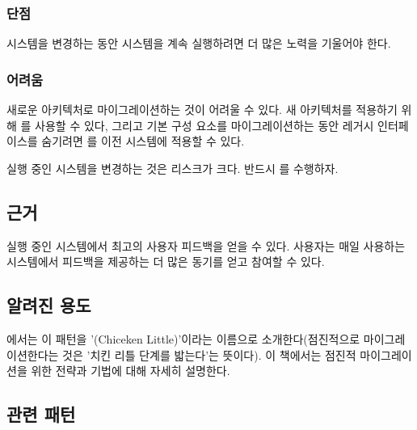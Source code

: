\documentclass[a4paper,10pt,twoside]{book}
\begin{document}
\subsubsection*{단점}

\begin{bulletlist}
\item 시스템을 변경하는 동안 시스템을 계속 실행하려면 더 많은 노력을 기울어야 한다.
\end{bulletlist}

\subsubsection*{어려움}

\begin{bulletlist}
\item 새로운 아키텍처로 마이그레이션하는 것이 어려울 수 있다. 새 아키텍처를 적용하기 위해 를 사용할 수 있다, 그리고 기본 구성 요소를 마이그레이션하는 동안 레거시 인터페이스를 숨기려면 를 이전 시스템에 적용할 수 있다.

\item 실행 중인 시스템을 변경하는 것은 리스크가 크다. 반드시 를 수행하자. 
\end{bulletlist}

\subsection*{근거}

실행 중인 시스템에서 최고의 사용자 피드백을 얻을 수 있다. 사용자는 매일 사용하는 시스템에서 피드백을 제공하는 더 많은 동기를 얻고 참여할 수 있다.

\subsection*{알려진 용도}

 \cite{Brod95a}에서는 이 패턴을 '(Chiceken Little)'이라는 이름으로 소개한다(점진적으로 마이그레이션한다는 것은 '치킨 리틀 단계를 밟는다'는 뜻이다). 이 책에서는 점진적 마이그레이션을 위한 전략과 기법에 대해 자세히 설명한다.

\subsection*{관련 패턴}
\end{document}
